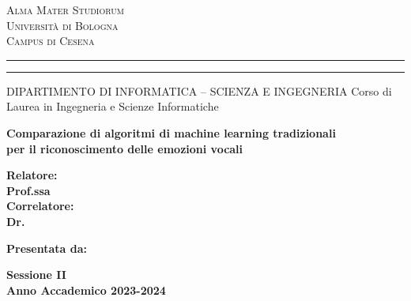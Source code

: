 
\oddsidemargin=25pt

\begin{titlepage}
\begin{center}
{{\Large{\textsc{Alma Mater Studiorum}}}\\
{\Large{\textsc{Universit\`a di Bologna}}} \\
{\textsc{Campus di Cesena}} \rule[0.1cm]{14cm}{0.1mm}
		\rule[0.5cm]{14cm}{0.6mm}
DIPARTIMENTO DI INFORMATICA – SCIENZA E INGEGNERIA
Corso di Laurea in Ingegneria e Scienze Informatiche }
\end{center}
\vspace{15mm}
\begin{center}
{\LARGE{\bf Comparazione di algoritmi di machine learning tradizionali}}\\
\vspace{3mm}
{\LARGE{\bf per il riconoscimento delle emozioni vocali}}\\
\end{center}
\vspace{40mm}
\par
\noindent
\begin{minipage}[t]{0.47\textwidth}
{\large{\bf Relatore:\\
Prof.ssa \xsupervisor}}
\vspace{5mm}
{\large{\bf \\Correlatore:\\
Dr. \xcorrelatore}}
\end{minipage}
\hfill
\begin{minipage}[t]{0.47\textwidth}\raggedleft
{\large{\bf Presentata da:\\
\xstudent}}
\end{minipage}
\vspace{20mm}
\begin{center}
{\large{\bf Sessione II\\%
Anno Accademico 2023-2024}}%
\end{center}
\end{titlepage}


